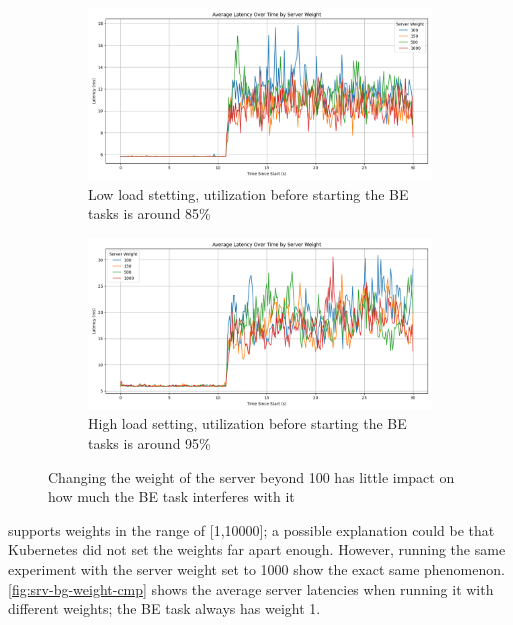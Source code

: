 \begin{figure}[t]
    \centering
    \begin{subfigure}{\columnwidth}
        \includegraphics[width=\columnwidth]{graphs/srv-bg-weight-cmp-low.png}
        \caption{Low load stetting, utilization before starting the BE tasks is
        around 85\%}\label{fig:srv-bg-weight-cmp-low}
        \vspace{12pt}
    \end{subfigure}
    \hspace{\fill}
    \begin{subfigure}{\columnwidth}
        \includegraphics[width=\columnwidth]{graphs/srv-bg-weight-cmp-high.png}
        \caption{High load setting, utilization before starting the BE tasks is
        around 95\%}\label{fig:srv-bg-weight-cmp-high}
    \end{subfigure}
    \vspace{4pt}
    \caption{Changing the weight of the server beyond 100 has little impact on
    how much the BE task interferes with it}\label{fig:srv-bg-weight-cmp}
\end{figure}

\cgroups{} supports weights in the range of [1,10000]; a possible explanation
could be that Kubernetes did not set the weights far apart enough. However,
running the same experiment with the server weight set to 1000 show the exact
same phenomenon. \autoref{fig:srv-bg-weight-cmp} shows the average server
latencies when running it with different weights; the BE task always has weight
1.

